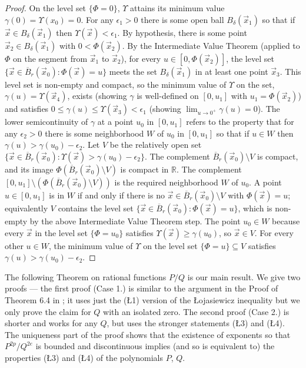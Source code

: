 \documentclass[12pt]{amsart}
\theoremstyle{definition}
\theoremstyle{remark}
\numberwithin{equation}{section}
\newcommand{\re}{\mathbb{R}}
\begin{document}
\begin{proof}
  On the level set $\{\Phi=0\}$, $\Upsilon$ attains its minimum value $\gamma(0)=\Upsilon(x_0)=0$.
  For any $\epsilon_1>0$ there is some open ball $B_\delta(\vec x_1)$ so that if $\vec x\in B_\delta(\vec x_1)$ then $\Upsilon(\vec x)<\epsilon_1$.  By hypothesis, there is some point $\vec x_2\in B_\delta(\vec x_1)$ with $0<\Phi(\vec x_2)$.  By the Intermediate Value Theorem (applied to $\Phi$ on the segment from $\vec x_1$ to $\vec x_2$), for every $u\in[0,\Phi(\vec x_2)]$, the level set $\{\vec x\in {\overline B}_r(\vec x_0):\Phi(\vec x)=u\}$ meets the set $B_\delta(\vec x_1)$ in at least one point $\vec x_3$.  This level set is non-empty and compact, so the minimum value of $\Upsilon$ on the set, $\gamma(u)=\Upsilon(\vec x_4)$, exists (showing $\gamma$ is well-defined on $[0,u_1]$ with $u_1=\Phi(\vec x_2)$) and satisfies $0\le\gamma(u)\le\Upsilon(\vec x_3)<\epsilon_1$ (showing $\displaystyle{\lim_{u\to0^+}\gamma(u)=0}$).  The lower semicontinuity of $\gamma$ at a point $u_0$ in $[0,u_1]$ refers to the property that for any $\epsilon_2>0$ there is some neighborhood $W$ of $u_0$ in $[0,u_1]$ so that if $u\in W$ then $\gamma(u)>\gamma(u_0)-\epsilon_2$.  Let $V$ be the relatively open set $\{\vec x\in{\overline B}_r(\vec x_0):\Upsilon(\vec x)>\gamma(u_0)-\epsilon_2\}$. 
  The complement ${\overline B}_r(\vec x_0)\setminus V$ is compact, and its image $\Phi({\overline B}_r(\vec x_0)\setminus V)$ is compact in $\re$.  The complement $[0,u_1]\setminus(\Phi({\overline B}_r(\vec x_0)\setminus V))$ is the required neighborhood $W$ of $u_0$.  A point $u\in[0,u_1]$ is in $W$ if and only if there is no $\vec x\in {\overline B}_r(\vec x_0)\setminus V$ with $\Phi(\vec x)=u$; equivalently $V$ contains the level set $\{\vec x\in {\overline B}_r(\vec x_0):\Phi(\vec x)=u\}$, which is non-empty by the above Intermediate Value Theorem step.   The point $u_0\in W$ because every $\vec x$ in the level set $\{\Phi=u_0\}$ satisfies $\Upsilon(\vec x)\ge\gamma(u_0)$, so $\vec x\in V$.  For every other $u\in W$, the minimum value of $\Upsilon$ on the level set $\{\Phi=u\}\subseteq V$ satisfies $\gamma(u)>\gamma(u_0)-\epsilon_2$.
\end{proof}



The following Theorem on rational functions $P/Q$ is our main result.  We give two proofs --- the first proof (Case 1.) is similar to the argument in the Proof of Theorem 6.4 in \cite{bm}; it uses just the (\L1) version of the \L ojasiewicz inequality but we only prove the claim for $Q$ with an isolated zero.  The second proof (Case 2.) is shorter and works for any $Q$, but uses the stronger  statements (\L3) and (\L4).  The uniqueness part of the proof shows that the existence of exponents so that $P^{2p}/Q^{2e}$ is bounded and discontinuous implies (and so is equivalent to) the properties (\L3) and (\L4) of the polynomials $P$, $Q$.
\end{document}
